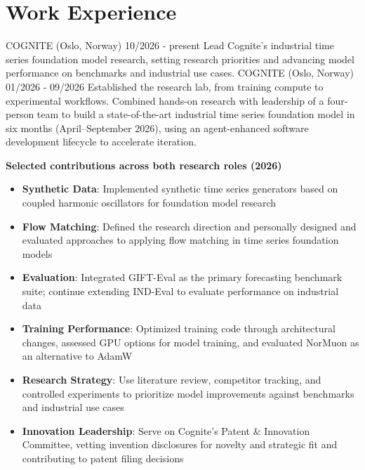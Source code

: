 \documentclass[singlesided,
               paper=a4,
               fontsize=10pt
              ]{my-resume}
\begin{document}
\section[\faBriefcase]{Work Experience}
    {COGNITE (Oslo, Norway)}
    {10/2026 - present}
    {
        Lead Cognite's industrial time series foundation model research, setting research priorities and advancing model performance on benchmarks and industrial use cases.
    }
    {COGNITE (Oslo, Norway)}
    {01/2026 - 09/2026}
    {
        Established the research lab, from training compute to experimental workflows. Combined hands-on research with leadership of a four-person team to build a state-of-the-art industrial time series foundation model in six months (April--September 2026), using an agent-enhanced software development lifecycle to accelerate iteration.
    }
{\small
\textbf{Selected contributions across both research roles (2026)}
\begin{itemize}[leftmargin=2em]
    \item \textbf{Synthetic Data}: Implemented synthetic time series generators based on coupled harmonic oscillators for foundation model research
    \item \textbf{Flow Matching}: Defined the research direction and personally designed and evaluated approaches to applying flow matching in time series foundation models
    \item \textbf{Evaluation}: Integrated GIFT-Eval as the primary forecasting benchmark suite; continue extending IND-Eval to evaluate performance on industrial data
    \item \textbf{Training Performance}: Optimized training code through architectural changes, assessed GPU options for model training, and evaluated NorMuon as an alternative to AdamW
    \item \textbf{Research Strategy}: Use literature review, competitor tracking, and controlled experiments to prioritize model improvements against benchmarks and industrial use cases
    \item \textbf{Innovation Leadership}: Serve on Cognite's Patent \& Innovation Committee, vetting invention disclosures for novelty and strategic fit and contributing to patent filing decisions
\end{itemize}
\par}
\end{document}
